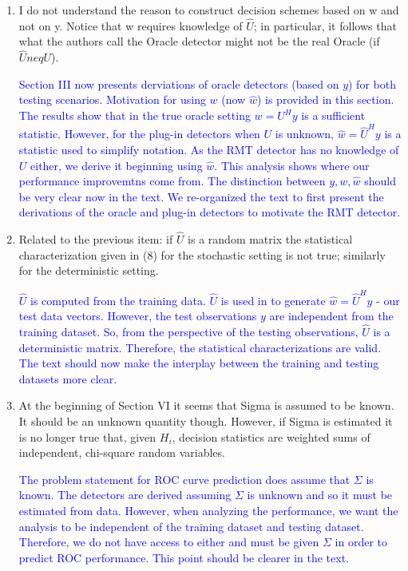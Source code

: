 \documentclass[11pt]{article}
\begin{document}
\begin{enumerate}
\item I do not understand the reason to construct decision schemes based on w and not on y. Notice that w requires knowledge of $\hat{U}$; in particular, it follows that what the authors call the Oracle detector might not be the real Oracle (if $\hat{U} neq U$).

\textcolor{blue}{Section III now presents derviations of oracle detectors (based on $y$) for both testing scenarios. Motivation for using $w$ (now $\widehat{w}$) is provided in this section. The results show that in the true oracle setting $w=U^Hy$ is a sufficient statistic. However, for the plug-in detectors when $U$ is unknown, $\widehat{w}=\widehat{U}^Hy$ is a statistic used to simplify notation. As the RMT detector has no knowledge of $U$ either, we derive it beginning using $\widehat{w}$. This analysis shows where our performance improvemtns come from. The distinction between $y,w,\widehat{w}$ should be very clear now in the text. We re-organized the text to first present the derivations of the oracle and plug-in detectors to motivate the RMT detector.}

\item Related to the previous item: if $\hat{U}$ is a random matrix the statistical characterization given in (8) for the stochastic setting is not true; similarly for the deterministic setting.

\textcolor{blue}{$\widehat{U}$ is computed from the training data. $\widehat{U}$ is used in to generate $\widehat{w}=\widehat{U}^Hy$ - our test data vectors. However, the test observations $y$ are independent from the training dataset. So, from the perspective of the testing observations, $\widehat{U}$ is a deterministic matrix. Therefore, the statistical characterizations are valid. The text should now make the interplay between the training and testing datasets more clear.}

\item At the beginning of Section VI it seems that Sigma is assumed to be known. It should be an unknown quantity though. However, if Sigma is estimated
it is no longer true that, given $H_i$, decision statistics are weighted sums of independent, chi-square random variables.

\textcolor{blue}{The problem statement for ROC curve prediction does assume that $\Sigma$ is known. The detectors are derived assuming $\Sigma$ is unknown and so it must be estimated from data. However, when analyzing the performance, we want the analysis to be independent of the training dataset and testing dataset. Therefore, we do not have access to either and must be given $\Sigma$ in order to predict ROC performance. This point should be clearer in the text.}


\end{enumerate}
\end{document}
